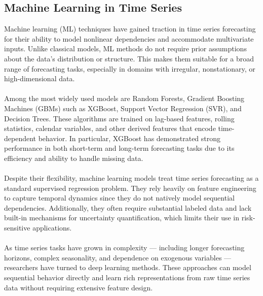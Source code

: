 \documentclass{article}
\begin{document}
\subsection{Machine Learning in Time Series}
Machine learning (ML) techniques have gained traction in time series forecasting for their ability to model nonlinear dependencies and accommodate multivariate inputs. Unlike classical models, ML methods do not require prior assumptions about the data's distribution or structure. This makes them suitable for a broad range of forecasting tasks, especially in domains with irregular, nonstationary, or high-dimensional data.\\
\\
Among the most widely used models are Random Forests, Gradient Boosting Machines (GBMs) such as XGBoost, Support Vector Regression (SVR), and Decision Trees. These algorithms are trained on lag-based features, rolling statistics, calendar variables, and other derived features that encode time-dependent behavior. In particular, XGBoost has demonstrated strong performance in both short-term and long-term forecasting tasks due to its efficiency and ability to handle missing data.\\
\\
Despite their flexibility, machine learning models treat time series forecasting as a standard supervised regression problem. They rely heavily on feature engineering to capture temporal dynamics since they do not natively model sequential dependencies. Additionally, they often require substantial labeled data and lack built-in mechanisms for uncertainty quantification, which limits their use in risk-sensitive applications.\\
\\
As time series tasks have grown in complexity — including longer forecasting horizons, complex seasonality, and dependence on exogenous variables — researchers have turned to deep learning methods. These approaches can model sequential behavior directly and learn rich representations from raw time series data without requiring extensive feature design.
\end{document}
